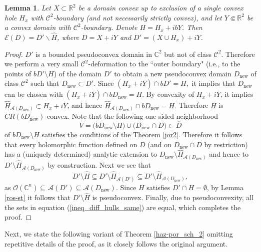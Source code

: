 \documentclass[12pt,reqno, a4paper]{amsart}
\newtheorem{lemma}[theorem]{Lemma}
\theoremstyle{definition}
\theoremstyle{definition}
\numberwithin{equation}{section}
\def\R{\mathbb{R}}                              %
\def\C{\mathbb{C}}                              %
\begin{document}
\begin{lemma}\label{cvx-lem}
	Let $X\subset\R^2$ be a domain convex up to exclusion of a single convex hole $H_x$ with $\mathcal{C}^2$-boundary (and not necessarily strictly convex), and let $Y\Subset\R^2$ be a convex domain with $\mathcal{C}^2$-boundary. Denote  ${H=H_{x}+ibY}$. Then $\mathcal{E}(D)=D'\backslash\widehat{H}$, where $D=X+iY$ and $D'=(X\cup H_x)+iY$.
\end{lemma} 

\begin{proof}
$D'$ is a bounded pseudoconvex domain in $\C^2$ but not of class $\mathcal{C}^2$. Therefore we perform a very small $\mathcal{C}^2$-deformation to the ``outer boundary" (i.e., to the points of $bD'\setminus H$) of the domain $D'$ to obtain a new pseudoconvex domain $D_{\text{new}}$ of class $\mathcal{C}^2$ such that $D_{\text{new}}\subset D'$. Since $(H_x+i\overline{Y}) \cap bD'=H,$ it implies that $D_{\text{new}}$ can be chosen with ${(H_x+i\overline{Y}) \cap bD_{\text{new}}=H}.$ By convexity of $H_x+i\overline{Y}$, it implies ${\widehat{H}}_{\mathcal{A}(D_{\text{new}})}\subset H_x+i\overline{Y}$, and hence  ${{\widehat{H}}_{\mathcal{A}(D_{\text{new}})}\cap bD_{\text{new}}=H.}$  Therefore $H$ is $CR(bD_{\text{new}})$-convex. Note that the following one-sided neighborhood $$V= \big(bD_{\text{new}} \setminus H\big) \cup \big(D_{\text{new}}\cap D\big) \subset \overline{D}$$ of $bD_{\text{new}} \setminus H$ satisfies the conditions of the Theorem \ref{jor2}. Therefore it follows that every holomorphic function defined on $D$ (and on $D_{\text{new}}\cap D$ by restriction) has a (uniquely
determined) analytic extension to $D_{\text{new}} \setminus {\widehat{H}}_{\mathcal{A}(D_{\text{new}})}$ and hence to ${D' \setminus {\widehat{H}}_{\mathcal{A}(D_{\text{new}})}}$ by construction. Next we see that
\begin{equation}\label{ineq_diff_hulls_same}
D'\setminus \widehat{H}\subseteq D'\setminus{\widehat{H}}_{\mathcal{A}(D')}\subseteq D'\setminus {\widehat{H}}_{\mathcal{A}(D_{\text{new}})},
\end{equation}
as $\mathcal{O}(\C^n)\subseteq \mathcal{A}(D')\subseteq \mathcal{A}(D_{\text{new}}).$ Since $H$ satisfies $D' \cap H=\emptyset$, by {Lemma \ref{ros-st}} it follows that $D'\setminus \widehat{H}$ is pseudoconvex. Finally, due to pseudoconvexity, all the sets in equation (\ref{ineq_diff_hulls_same}) are equal, which completes the proof.
\end{proof}

Next, we state the following variant of Theorem \ref{haz-por_sch_2} omitting repetitive details of the proof, as it closely follows the original argument. 
\end{document}
